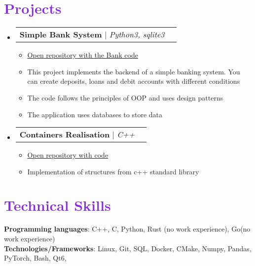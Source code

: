 \documentclass[letterpaper,11pt]{article}
\makeatletter
\newcommand{\resumeItem}[1]{
  \item\small{
    {#1 \vspace{-2pt}}
  }
}
\newcommand{\resumeSubheading}[4]{
  \vspace{-2pt}\item
    \begin{tabular*}{1.0\textwidth}[t]{l@{\extracolsep{\fill}}r}
      \textbf{#1} & \textbf{\small #2} \\
      \textit{\small#3} & \textit{\small #4} \\
    \end{tabular*}\vspace{-7pt}
}
\newcommand{\resumeProjectHeading}[2]{
    \item
    \begin{tabular*}{1.001\textwidth}{l@{\extracolsep{\fill}}r}
      \small#1 & \textbf{\small #2}\\
    \end{tabular*}\vspace{-7pt}
}
\newcommand{\resumeSubHeadingListStart}{\begin{itemize}[leftmargin=0.0in, label={}]}
\newcommand{\resumeSubHeadingListEnd}{\end{itemize}}
\newcommand{\resumeItemListStart}{\begin{itemize}}
\newcommand{\resumeItemListEnd}{\end{itemize}\vspace{-5pt}}
\makeatother
\begin{document}
    

\section{\textcolor{BlueViolet}{Projects}}
    \vspace{-5pt}
    \resumeSubHeadingListStart
      \resumeProjectHeading
          {\textbf{Simple Bank System} $|$ \emph{Python3, sqlite3}}{}
          \resumeItemListStart
            \resumeItem{\href{https://github.com/dmsuty/Simple-Bank-System}{\textcolor{Emerald}{\underline{Open repository with the Bank code}}}}
            \resumeItem{This project implements the backend of a simple banking system. You can create deposits, loans and debit accounts with different conditions}
            \resumeItem{The code follows the principles of OOP and uses design patterns}
            \resumeItem{The application uses databases to store data}
          \resumeItemListEnd
          \vspace{-13pt}
      \resumeProjectHeading
        {\textbf{Containers Realisation} $|$ \emph{C++}}{}
          \resumeItemListStart
            \resumeItem{\href{https://github.com/dmsuty/std-containers}{\textcolor{Emerald}{\underline{Open repository with code}}}}
            \resumeItem{Implementation of structures from c++ standard library}
          \resumeItemListEnd
    \resumeSubHeadingListEnd
\vspace{-15pt}


%
\section{\textcolor{BlueViolet}{Technical Skills}}
 \begin{itemize}[leftmargin=0.15in, label={}]
    \small{\item{
        \textbf{Programming languages}{: C++, C, Python, Rust (no work experience), Go(no work experience)} \\
     \textbf{Technologies/Frameworks}{: Linux, Git, SQL, Docker, CMake, Numpy, Pandas, PyTorch, Bash, Qt6, } \\
    }}
 \end{itemize}
 \vspace{-16pt}
\end{document}
